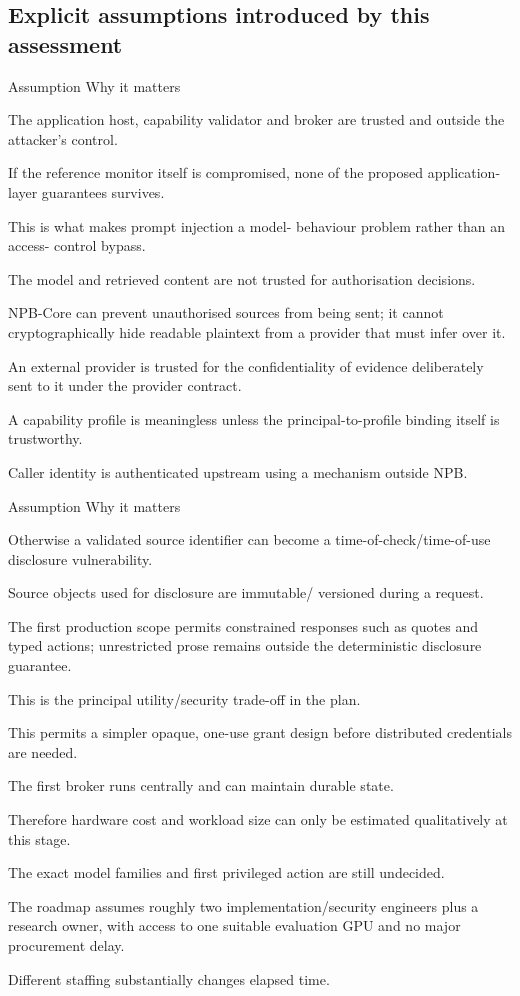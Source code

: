 \documentclass[11pt,a4paper]{article}
\begin{document}
\subsection*{Explicit assumptions introduced by this assessment}
Assumption Why it matters\par
The application host, capability validator and broker are trusted and outside the attacker's control.\par
If the reference monitor itself is compromised, none of the proposed application-layer guarantees survives.\par
This is what makes prompt injection a model- behaviour problem rather than an access- control bypass.\par
The model and retrieved content are not trusted for authorisation decisions.\par
NPB-Core can prevent unauthorised sources from being sent; it cannot cryptographically hide readable plaintext from a provider that must infer over it.\par
An external provider is trusted for the confidentiality of evidence deliberately sent to it under the provider contract.\par
A capability profile is meaningless unless the principal-to-profile binding itself is trustworthy.\par
Caller identity is authenticated upstream using a mechanism outside NPB.\par
Assumption Why it matters\par
Otherwise a validated source identifier can become a time-of-check/time-of-use disclosure vulnerability.\par
Source objects used for disclosure are immutable/ versioned during a request.\par
The first production scope permits constrained responses such as quotes and typed actions; unrestricted prose remains outside the deterministic disclosure guarantee.\par
This is the principal utility/security trade-off in the plan.\par
This permits a simpler opaque, one-use grant design before distributed credentials are needed.\par
The first broker runs centrally and can maintain durable state.\par
Therefore hardware cost and workload size can only be estimated qualitatively at this stage.\par
The exact model families and first privileged action are still undecided.\par
The roadmap assumes roughly two implementation/security engineers plus a research owner, with access to one suitable evaluation GPU and no major procurement delay.\par
Different staffing substantially changes elapsed time.\par
\end{document}
